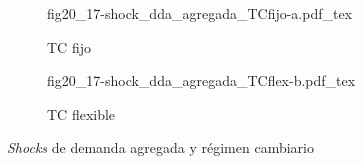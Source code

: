 \begin{figure}[h]
\captionsetup[subfigure]{aboveskip=20pt,belowskip=15pt}
\centering
\begin{subfigure}{.45\textwidth}
  \centering
        \def\svgwidth{\textwidth}
        {fig20_17-shock_dda_agregada_TCfijo-a.pdf_tex}
  \caption{TC fijo}
  \label{fig20_16-shock_monetario_TCfijo-a}
\end{subfigure}\hspace{.05\textwidth}
\begin{subfigure}{.45\textwidth}
  \centering
        \def\svgwidth{\textwidth}
        {fig20_17-shock_dda_agregada_TCflex-b.pdf_tex}
  \caption{TC flexible}
  \label{fig20_16-shock_monetario_TCflex-b}
\end{subfigure}
\caption{\textit{Shocks} de demanda agregada y régimen cambiario}
\label{fig20_17-shock_dda_agregada}
\end{figure}